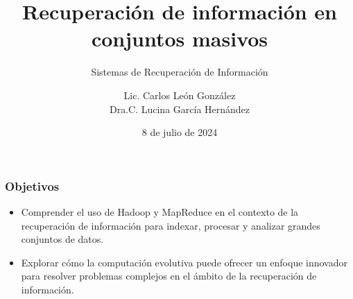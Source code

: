\documentclass[
10pt, %
aspectratio=169, %
]{beamer}
\title[Short Title]{Recuperación de información en conjuntos masivos}
\subtitle{Sistemas de Recuperación de Información}
\author{Lic. Carlos León González \\ Dra.C. Lucina García Hernández}
\institute[UC]{Facultad de Matem\'atica y Computaci\'on \\ Universidad de La Habana \\ \smallskip }
\date{8 de julio de  2024} %
\begin{document}
	
	
	
	\begin{frame}
		\titlepage
	\end{frame}
	
	\begin{frame}
		
		\frametitle{Objetivos}
		
		\begin{itemize}
			
			\item Comprender el uso de Hadoop y MapReduce en el contexto de la recuperación de información para indexar, procesar y analizar grandes conjuntos de datos. \\[2mm]
			
			\item Explorar cómo la computación evolutiva puede ofrecer un enfoque innovador para resolver problemas complejos en el ámbito de la recuperación de información. 
			
		\end{itemize}
		
	\end{frame}
	
\end{document}
